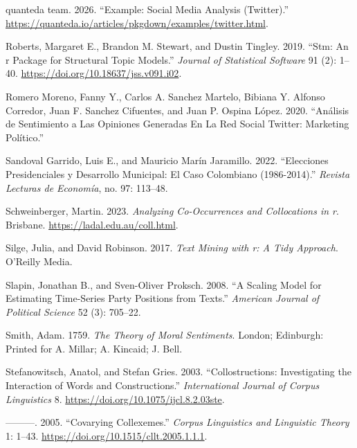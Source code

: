 \documentclass[
]{interact}
\newlength{\cslhangindent}
\newenvironment{CSLReferences}[2] %
 {\begin{list}{}{%
  \setlength{\itemindent}{0pt}
  \setlength{\leftmargin}{0pt}
  \setlength{\parsep}{0pt}
  \ifodd #1
   \setlength{\leftmargin}{\cslhangindent}
   \setlength{\itemindent}{-1\cslhangindent}
  \fi
  \setlength{\itemsep}{#2\baselineskip}}}
 {\end{list}}
\begin{document}
\begin{CSLReferences}{1}{0}
quanteda team. 2026. {``Example: Social Media Analysis (Twitter).''}
\url{https://quanteda.io/articles/pkgdown/examples/twitter.html}.

Roberts, Margaret E., Brandon M. Stewart, and Dustin Tingley. 2019.
{``Stm: An r Package for Structural Topic Models.''} \emph{Journal of
Statistical Software} 91 (2): 1--40.
\url{https://doi.org/10.18637/jss.v091.i02}.

Romero Moreno, Fanny Y., Carlos A. Sanchez Martelo, Bibiana Y. Alfonso
Corredor, Juan F. Sanchez Cifuentes, and Juan P. Ospina López. 2020.
{``An{á}lisis de Sentimiento a Las Opiniones Generadas En La Red Social
Twitter: Marketing Pol{í}tico.''}

Sandoval Garrido, Luis E., and Mauricio Marín Jaramillo. 2022.
{``Elecciones Presidenciales y Desarrollo Municipal: El Caso Colombiano
(1986-2014).''} \emph{Revista Lecturas de Econom{í}a}, no. 97: 113--48.

Schweinberger, Martin. 2023. \emph{Analyzing Co-Occurrences and
Collocations in r}. Brisbane. \url{https://ladal.edu.au/coll.html}.

Silge, Julia, and David Robinson. 2017. \emph{Text Mining with r: A Tidy
Approach}. O'Reilly Media.

Slapin, Jonathan B., and Sven-Oliver Proksch. 2008. {``A Scaling Model
for Estimating Time-Series Party Positions from Texts.''} \emph{American
Journal of Political Science} 52 (3): 705--22.

Smith, Adam. 1759. \emph{The Theory of Moral Sentiments}. London;
Edinburgh: Printed for A. Millar; A. Kincaid; J. Bell.

Stefanowitsch, Anatol, and Stefan Gries. 2003. {``Collostructions:
Investigating the Interaction of Words and Constructions.''}
\emph{International Journal of Corpus Linguistics} 8.
\url{https://doi.org/10.1075/ijcl.8.2.03ste}.

---------. 2005. {``Covarying Collexemes.''} \emph{Corpus Linguistics
and Linguistic Theory} 1: 1--43.
\url{https://doi.org/10.1515/cllt.2005.1.1.1}.


\end{CSLReferences}
\end{document}
